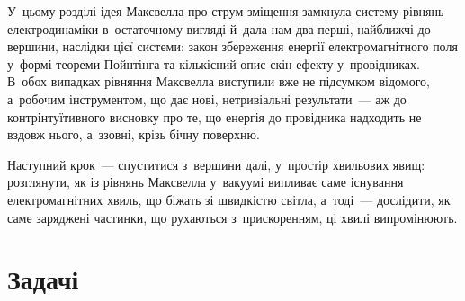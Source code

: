  {}

У~цьому розділі ідея Максвелла про струм зміщення замкнула систему рівнянь електродинаміки
в~остаточному вигляді й~дала нам два перші, найближчі до вершини, наслідки цієї системи:
закон збереження енергії електромагнітного поля у~формі теореми Пойнтінга та кількісний
опис скін-ефекту у~провідниках. В~обох випадках рівняння Максвелла виступили вже не
підсумком відомого, а~робочим інструментом, що дає нові, нетривіальні результати~--- аж до
контрінтуїтивного висновку про те, що енергія до провідника надходить не вздовж нього,
а~ззовні, крізь бічну поверхню.

Наступний крок~--- спуститися з~вершини далі, у~простір хвильових явищ: розглянути, як із
рівнянь Максвелла у~вакуумі випливає саме існування електромагнітних хвиль, що біжать зі
швидкістю світла, а~тоді~--- дослідити, як саме заряджені частинки, що рухаються
з~прискоренням, ці хвилі випромінюють.


\section*{Задачі}


